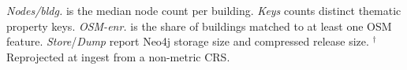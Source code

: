 \documentclass[sigconf,authordraft]{acmart}
\newcommand{\benchname}{\textit{Authenti\-City}}
\begin{document}
\begin{table}[h!]
  \smallskip\raggedright\footnotesize
  \emph{Nodes/bldg.} is the median node count per building. \emph{Keys} counts distinct thematic property keys. \emph{OSM-enr.} is the share of buildings matched to at least one OSM feature. \emph{Store}/\emph{Dump} report Neo4j storage size and compressed release size. $^\dagger$ Reprojected at ingest from a non-metric CRS.
\end{table}

\end{document}
